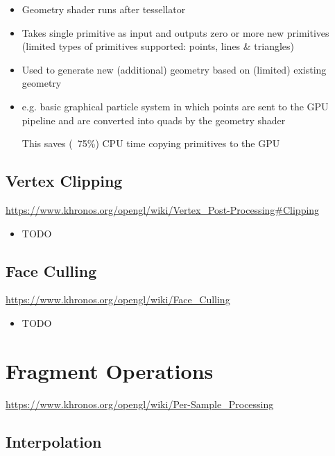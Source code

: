 \documentclass[a4paper]{article}
\begin{document}
\begin{itemize}
  \item
    Geometry shader runs after tessellator

  \item
    Takes single primitive as input and outputs zero or more new primitives
    (limited types of primitives supported: points, lines \& triangles)

  \item
    Used to generate new (additional) geometry based on (limited) existing
    geometry

  \item
    e.g. basic graphical particle system in which points are sent to the GPU
    pipeline and are converted into quads by the geometry shader

    This saves (~75\%) CPU time copying primitives to the GPU

\end{itemize}

\subsection{Vertex Clipping}

\url{https://www.khronos.org/opengl/wiki/Vertex_Post-Processing#Clipping}

\begin{itemize}
  \item
    TODO

\end{itemize}

\subsection{Face Culling}

\url{https://www.khronos.org/opengl/wiki/Face_Culling}

\begin{itemize}
  \item
    TODO

\end{itemize}

\section{Fragment Operations}
\label{sec:fragment_operations}

\url{https://www.khronos.org/opengl/wiki/Per-Sample_Processing}

\subsection{Interpolation}
\end{document}
